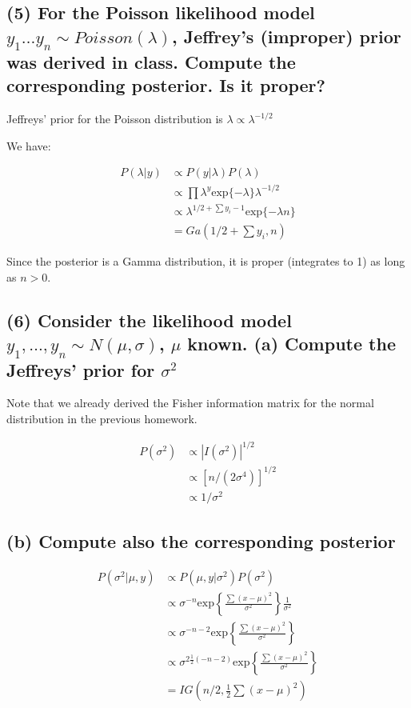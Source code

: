 \documentclass[11pt]{article}
\begin{document}
\subsection*{(5) For the Poisson likelihood model $y_1\ldots y_n
 \sim Poisson(\lambda)$, Jeffrey’s (improper) prior was derived in class. Compute the corresponding posterior. Is it proper?}

Jeffreys' prior for the Poisson distribution is $\lambda \propto \lambda^{-1/2}$

We have:

\begin{align*}
    P(\lambda|y) &\propto P(y|\lambda)P(\lambda)\\
    &\propto \prod \lambda^y\text{exp}\{-\lambda\}\lambda^{-1/2}\\
    &\propto  \lambda^{1/2 + \sum y_i - 1} \text{exp}\{-\lambda n\}\\
    &= Ga\left(1/2 + \sum y_i, n \right)
    \end{align*}
    
Since the posterior is a Gamma distribution, it is proper (integrates to 1) as long as $n > 0$.

\subsection*{(6)  Consider the likelihood model $ y_1, \ldots , y_n \sim N(\mu, \sigma)$, $\mu$ known. (a) Compute the Jeffreys’ prior for $\sigma^2$ }
Note that we already derived the Fisher information matrix for the normal distribution in the previous homework.

\begin{align*}
    P(\sigma^2) &\propto |I(\sigma^2)|^{1/2}\\
    &\propto [n/(2\sigma^4)]^{1/2}\\
    &\propto 1/\sigma^2
\end{align*}

\subsection*{(b) Compute also the corresponding posterior}

\begin{align*}
    P(\sigma^2|\mu, y) &\propto P(\mu, y|\sigma^2)P(\sigma^2)\\
    &\propto  \sigma^{-n}\text{exp}\left \{ \frac{\sum(x-\mu)^2}{\sigma^2}\right \} \frac{1}{\sigma^2}\\
    &\propto  \sigma^{-n-2}\text{exp}\left \{ \frac{\sum(x-\mu)^2}{\sigma^2}\right \} \\
     &\propto  \sigma^{2\frac{1}{2}{(-n-2)}}\text{exp}\left \{ \frac{\sum(x-\mu)^2}{\sigma^2}\right \} \\
     &= IG\left(n/2, \frac{1}{2}\sum(x-\mu)^2\right) 
\end{align*}
\end{document}

